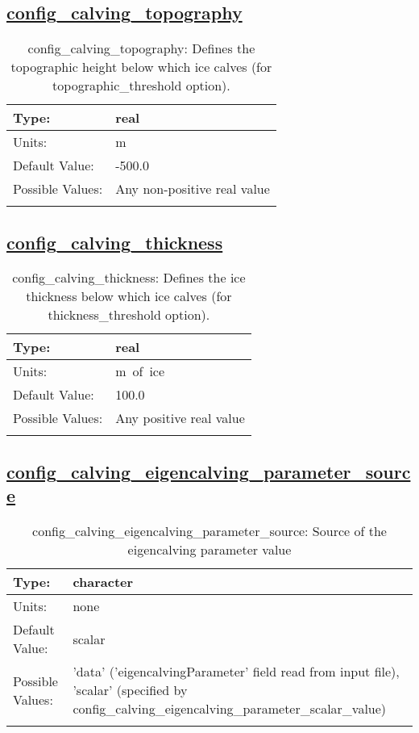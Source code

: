 \subsection[config\_calving\_topography]{\hyperref[sec:nm_tab_calving]{config\_calving\_topography}}
\label{subsec:nm_sec_config_calving_topography}
\begin{center}
\begin{longtable}{| p{2.0in} || p{4.0in} |}
    \hline
    Type: & real \\
    \hline
    Units: & \si{m} \\
    \hline
    Default Value: & -500.0 \\
    \hline
    Possible Values: & Any non-positive real value \\
    \hline
    \caption{config\_calving\_topography: Defines the topographic height below which ice calves (for topographic\_threshold option).}
\end{longtable}
\end{center}
\subsection[config\_calving\_thickness]{\hyperref[sec:nm_tab_calving]{config\_calving\_thickness}}
\label{subsec:nm_sec_config_calving_thickness}
\begin{center}
\begin{longtable}{| p{2.0in} || p{4.0in} |}
    \hline
    Type: & real \\
    \hline
    Units: & \si{m.of.ice} \\
    \hline
    Default Value: & 100.0 \\
    \hline
    Possible Values: & Any positive real value \\
    \hline
    \caption{config\_calving\_thickness: Defines the ice thickness below which ice calves (for thickness\_threshold option).}
\end{longtable}
\end{center}
\subsection[config\_calving\_eigencalving\_parameter\_source]{\hyperref[sec:nm_tab_calving]{config\_calving\_eigencalving\_parameter\_source}}
\label{subsec:nm_sec_config_calving_eigencalving_parameter_source}
\begin{center}
\begin{longtable}{| p{2.0in} || p{4.0in} |}
    \hline
    Type: & character \\
    \hline
    Units: & \si{none} \\
    \hline
    Default Value: & scalar \\
    \hline
    Possible Values: & 'data' ('eigencalvingParameter' field read from input file), 'scalar' (specified by config\_calving\_eigencalving\_parameter\_scalar\_value) \\
    \hline
    \caption{config\_calving\_eigencalving\_parameter\_source: Source of the eigencalving parameter value}
\end{longtable}
\end{center}
